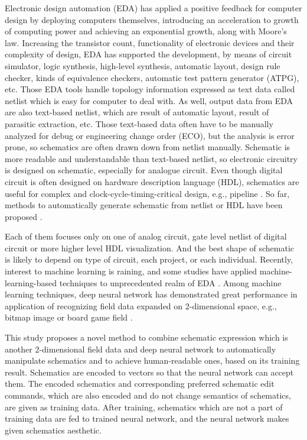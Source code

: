 \documentclass[twocolumn]{article}
\begin{document}
Electronic design automation (EDA) has applied a positive feedback
for computer design by deploying computers themselves,
introducing an acceleration to growth of computing power
and achieving an exponential growth, along with Moore’s law.
Increasing the transistor count,
functionality of electronic devices and their complexity of design,
EDA has supported the development, by means of circuit simulator,
logic synthesis, high-level synthesis, automatic layout,
design rule checker, kinds of equivalence checkers,
automatic test pattern generator (ATPG), etc.
Those EDA tools handle topology information expressed as text data
called netlist which is easy for computer to deal with.
As well, output data from EDA are also text-based netlist,
which are result of automatic layout, result of parasitic extraction, etc.
Those text-based data often have to be manually analyzed
for debug or engineering change order (ECO),
but the analysis is error prone,
so schematics are often drawn down from netlist manually.
Schematic is more readable and understandable than text-based netlist,
so electronic circuitry is designed on schematic,
especially for analogue circuit.
Even though digital circuit is often designed
on hardware description language (HDL),
schematics are useful for complex and clock-cycle-timing-critical design,
e.g., pipeline \cite{ph}.
So far, methods to automatically generate schematic from netlist or HDL
have been proposed
\cite{nauts}
\cite{anshul}
\cite{fiduccia}
\cite{chun}
\cite{green}
\cite{tsung}
\cite{bogdan}.

Each of them focuses only on one of analog circuit,
gate level netlist of digital circuit
or more higher level HDL visualization.
And the best shape of schematic is likely to depend on
type of circuit, each project, or each individual.
Recently, interest to machine learning is raining,
and some studies have applied machine-learning-based techniques
to unprecedented realm of EDA \cite{fan} \cite{sourav}.
Among machine learning techniques,
deep neural network has demonstrated great performance
in application of recognizing field data
expanded on 2-dimensional space,
e.g., bitmap image or board game field \cite{nips} \cite{alphago}.

This study proposes a novel method to combine schematic expression
which is another 2-dimensional field data
and deep neural network to automatically manipulate schematics
and to achieve human-readable ones, based on its training result.
Schematics are encoded to vectors so that the neural network can accept them.
The encoded schematics and corresponding preferred schematic edit commands,
which are also encoded and do not change semantics of schematics,
are given as training data.
After training, schematics which are not a part of training data
are fed to trained neural network,
and the neural network makes given schematics aesthetic.
\end{document}
